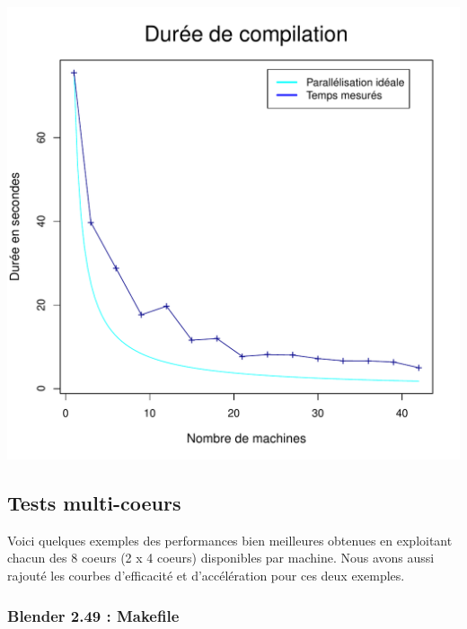 \documentclass[a4paper, 11pt, titlepage]{article}
\begin{document}
\begin{center}
    \includegraphics[scale=0.45]{res/sujet_makefiles_premier_Makefile-small_nth1.pdf}
\end{center}




\newpage

\subsection {Tests multi-coeurs}

Voici quelques exemples des performances bien meilleures obtenues en exploitant chacun des 8 coeurs (2 x 4 coeurs) disponibles par machine. Nous avons aussi rajouté les courbes d'efficacité et d'accélération pour ces deux exemples.

\subsubsection {Blender 2.49 : Makefile}
\end{document}
